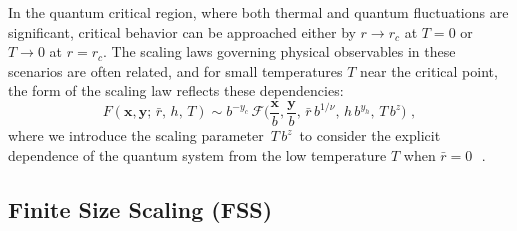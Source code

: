In the quantum critical region, where both thermal and quantum fluctuations are significant, critical behavior can be approached either by $ r \rightarrow r_c $ at $ T = 0 $ or $ T \rightarrow 0 $ at $ r = r_c $. The scaling laws governing physical observables in these scenarios are often related, and for small temperatures $ T $ near the critical point, the form of the scaling law reflects these dependencies:
\begin{equation}
	\label{scalinglawT}
	F(\bm x, \bm y;\,\bar r,\,h,\,T) \sim b^{-y_c} \, \mathscr{F}\biggl( \frac{\bm x}{b} , \frac{\bm y}{b}, \,\bar r \,b^{1/\nu}, \, h\,b^{y_h} , \,T\,b^z \biggl) \,\, ,
\end{equation}
where we introduce the scaling parameter $\,T\,b^z \,$ to consider the explicit dependence of the quantum system from the low temperature $T$ when $\bar r=0\,$~\cite{S99}.


\subsection{Finite Size Scaling (FSS)}

